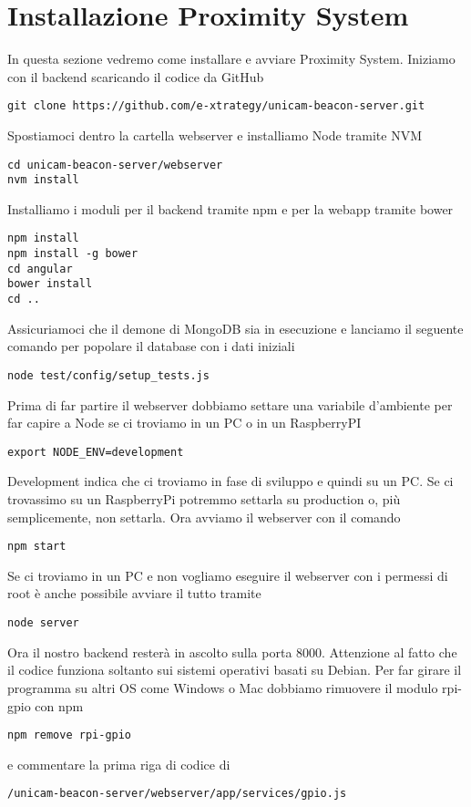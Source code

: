 \chapter{Installazione Proximity System}

In questa sezione vedremo come installare e avviare Proximity System.
Iniziamo con il backend scaricando il codice da GitHub
\begin{lstlisting}[style=JavaScriptCode]
git clone https://github.com/e-xtrategy/unicam-beacon-server.git
\end{lstlisting}
Spostiamoci dentro la cartella webserver e installiamo Node tramite NVM
\begin{lstlisting}[style=JavaScriptCode]
cd unicam-beacon-server/webserver
nvm install
\end{lstlisting}
Installiamo i moduli per il backend tramite npm e per la webapp tramite bower
\begin{lstlisting}[style=JavaScriptCode]
npm install
npm install -g bower
cd angular
bower install
cd ..
\end{lstlisting}
Assicuriamoci che il demone di MongoDB sia in esecuzione e lanciamo il seguente comando per popolare il database con i dati iniziali
\begin{lstlisting}[style=JavaScriptCode]
node test/config/setup_tests.js
\end{lstlisting}
Prima di far partire il webserver dobbiamo settare una variabile d'ambiente per far capire a Node se ci troviamo in un PC o in un RaspberryPI
\begin{lstlisting}[style=JavaScriptCode]
export NODE_ENV=development
\end{lstlisting}
Development indica che ci troviamo in fase di sviluppo e quindi su un PC.
Se ci trovassimo su un RaspberryPi potremmo settarla su production o, più semplicemente, non settarla.
Ora avviamo il webserver con il comando
\begin{lstlisting}[style=JavaScriptCode]
npm start
\end{lstlisting}
Se ci troviamo in un PC e non vogliamo eseguire il webserver con i permessi di root è anche possibile avviare il tutto tramite
\begin{lstlisting}[style=JavaScriptCode]
node server
\end{lstlisting}
Ora il nostro backend resterà in ascolto sulla porta 8000.
Attenzione al fatto che il codice funziona soltanto sui sistemi operativi basati su Debian.
Per far girare il programma su altri OS come Windows o Mac dobbiamo rimuovere il modulo rpi-gpio con npm 
\begin{lstlisting}[style=JavaScriptCode]
npm remove rpi-gpio
\end{lstlisting}
e commentare la prima riga di codice di
\begin{lstlisting}[style=JavaScriptCode]
/unicam-beacon-server/webserver/app/services/gpio.js
\end{lstlisting}

